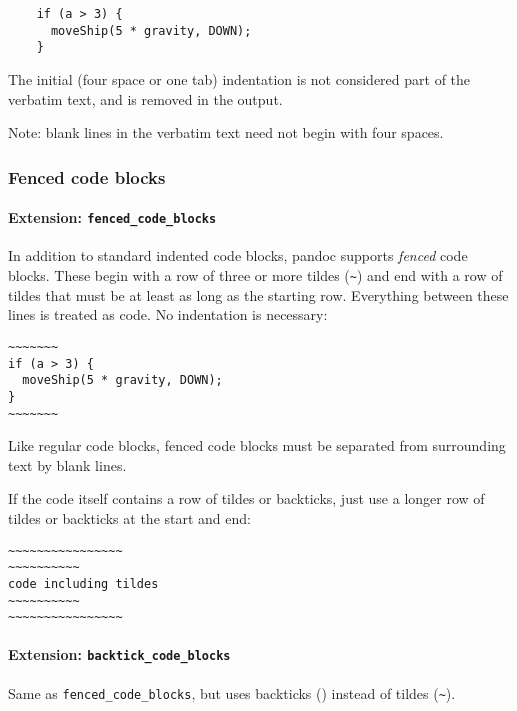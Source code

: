 \documentclass[
]{article}
\begin{document}
\begin{verbatim}
    if (a > 3) {
      moveShip(5 * gravity, DOWN);
    }
\end{verbatim}

The initial (four space or one tab) indentation is not considered part
of the verbatim text, and is removed in the output.

Note: blank lines in the verbatim text need not begin with four spaces.

\subsubsection{Fenced code blocks}\label{fenced-code-blocks}

\paragraph{\texorpdfstring{Extension:
\texttt{fenced\_code\_blocks}}{Extension: fenced\_code\_blocks}}\label{extension-fenced_code_blocks}

In addition to standard indented code blocks, pandoc supports
\emph{fenced} code blocks. These begin with a row of three or more
tildes (\texttt{\textasciitilde{}}) and end with a row of tildes that
must be at least as long as the starting row. Everything between these
lines is treated as code. No indentation is necessary:

\begin{verbatim}
~~~~~~~
if (a > 3) {
  moveShip(5 * gravity, DOWN);
}
~~~~~~~
\end{verbatim}

Like regular code blocks, fenced code blocks must be separated from
surrounding text by blank lines.

If the code itself contains a row of tildes or backticks, just use a
longer row of tildes or backticks at the start and end:

\begin{verbatim}
~~~~~~~~~~~~~~~~
~~~~~~~~~~
code including tildes
~~~~~~~~~~
~~~~~~~~~~~~~~~~
\end{verbatim}

\paragraph{\texorpdfstring{Extension:
\texttt{backtick\_code\_blocks}}{Extension: backtick\_code\_blocks}}\label{extension-backtick_code_blocks}

Same as \texttt{fenced\_code\_blocks}, but uses backticks
(\texttt{\textasciigrave{}}) instead of tildes
(\texttt{\textasciitilde{}}).
\end{document}
